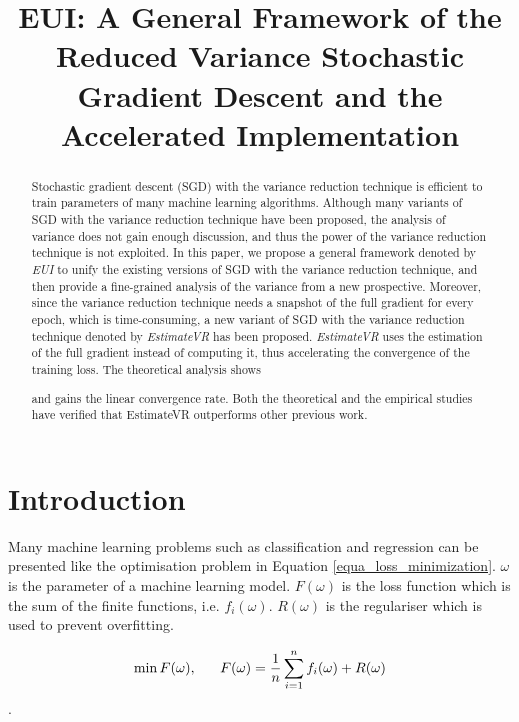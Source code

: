 \documentclass[letterpaper]{article}
\begin{document}
%
\title{EUI: A General Framework of the Reduced Variance Stochastic Gradient Descent and the Accelerated Implementation}
\maketitle
\begin{abstract}
Stochastic gradient descent (SGD) with the variance reduction  technique is efficient to train parameters of many machine learning algorithms. Although many variants of SGD with the variance reduction technique have been proposed,  the analysis of variance does not gain enough discussion, and thus the power of the variance reduction technique is not exploited. In this paper, we propose a general framework denoted by \emph{EUI}  to unify the existing versions of SGD with the variance reduction technique, and then  provide a fine-grained analysis of the variance from a new prospective. Moreover,  since the variance reduction technique needs a snapshot of the full gradient  for every epoch, which is time-consuming, a new variant of SGD with the variance reduction technique denoted by \emph{EstimateVR} has been proposed. \emph{EstimateVR} uses the estimation of the full gradient instead of computing it, thus accelerating the convergence of the training loss. 
The theoretical analysis shows 

 and gains the linear convergence rate.  Both the theoretical and the empirical studies have verified that EstimateVR outperforms other previous work. 
\end{abstract}

\section{Introduction}
\label{sect_introduction}
Many machine learning problems such as classification and regression  can be  presented like the optimisation problem in Equation \ref{equa_loss_minimization}. $\omega$ is the parameter of a machine learning model. $F(\omega)$ is the loss function which is the sum of the finite functions, i.e. $f_i(\omega)$. $R(\omega)$ is the regulariser  which is used to prevent overfitting.    

\begin{equation}
\label{equa_loss_minimization}
\min F(\omega),~~~~~F(\omega)=\frac{1}{n}\sum\limits_{i=1}^n f_i(\omega)+R(\omega)\\
\end{equation}. 
\end{document}
